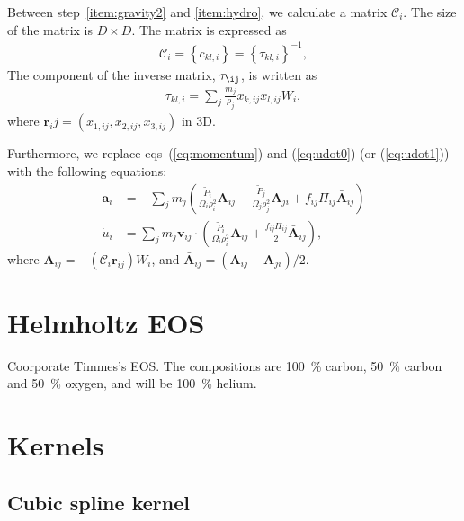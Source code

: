\documentclass[fleqn,dvipdfmx]{article}
\begin{document}
Between step~\ref{item:gravity2} and \ref{item:hydro}, we calculate a
matrix $\mathcal{C}_i$. The size of the matrix is $D \times D$. The
matrix is expressed as
\begin{align}
  \mathcal{C}_i = \left\{ c_{kl,i} \right\} = \left\{ \tau_{kl,i}
  \right\}^{-1},
\end{align}
The component of the inverse matrix, $\tau_{\ij}$, is written as
\begin{align}
  \tau_{kl,i} = \sum_j \frac{m_j}{\rho_j} x_{k,ij} x_{l,ij} W_i,
\end{align}
where $\bm{r}_ij = (x_{1,ij}, x_{2,ij}, x_{3,ij})$ in 3D.

Furthermore, we replace eqs~(\ref{eq:momentum}) and (\ref{eq:udot0})
(or (\ref{eq:udot1})) with the following equations:
\begin{align}
  \bm{a}_i &= - \sum_j m_j \left( \frac{\tilde{P}_i}{\Omega_i
    \rho_i^2} \bm{A}_{ij} - \frac{\tilde{P}_j}{\Omega_j \rho_j^2}
  \bm{A}_{ji} + f_{ij} \Pi_{ij} \bar{\bm{A}}_{ij} \right) \\
  \dot{u}_i &= \sum_j m_j \bm{v}_{ij} \cdot \left(
  \frac{\tilde{P}_i}{\Omega_i \rho_i^2} \bm{A}_{ij} +
  \frac{f_{ij}\Pi_{ij}}{2} \bar{\bm{A}}_{ij} \right),
\end{align}
where $\bm{A}_{ij}=- \left( \mathcal{C}_i \bm{r}_{ij} \right) W_i$,
and $\bar{\bm{A}}_{ij}=\left( \bm{A}_{ij} - \bm{A}_{ji} \right)/2$.

\section{Helmholtz EOS}

Coorporate Timmes's EOS. The compositions are 100~\% carbon, 50~\%
carbon and 50~\% oxygen, and will be 100~\% helium.

\appendix

\section{Kernels}
\label{sec:kernels}

\subsection{Cubic spline kernel}
\end{document}
